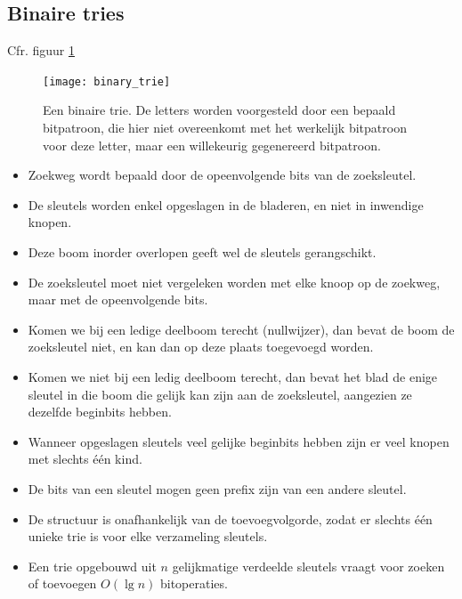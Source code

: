 \documentclass{report}
\begin{document}
\subsection{Binaire tries}
Cfr. figuur \ref{fig:binary_trie}
\begin{figure}[ht]
	\centering
	\texttt{[image: binary\_trie]}
	\caption{Een binaire trie. De letters worden voorgesteld door een bepaald bitpatroon, die hier niet overeenkomt met het werkelijk bitpatroon voor deze letter, maar een willekeurig gegenereerd bitpatroon.}
	\label{fig:binary_trie}
\end{figure}
\begin{itemize}
	\item[\info] Zoekweg wordt bepaald door de opeenvolgende bits van de zoeksleutel.
	\item[\info] De sleutels worden enkel opgeslagen in de bladeren, en niet in inwendige knopen.
	\item[\good] Deze boom inorder overlopen geeft wel de sleutels gerangschikt.
	\item[\good] De zoeksleutel moet niet vergeleken worden met elke knoop op de zoekweg, maar met de opeenvolgende bits.  
	\item[\info] Komen we bij een ledige deelboom terecht (nullwijzer), dan bevat de boom de zoeksleutel niet, en kan dan op deze plaats toegevoegd worden.
	\item[\info] Komen we niet bij een ledig deelboom terecht, dan bevat het blad de enige sleutel in die boom die gelijk kan zijn aan de zoeksleutel, aangezien ze dezelfde beginbits hebben.
	\item[\alert] Wanneer opgeslagen sleutels veel gelijke beginbits hebben zijn er veel knopen met slechts één kind.
	\item[\alert] De bits van een sleutel mogen geen prefix zijn van een andere sleutel. 
	\item[\good] De structuur is onafhankelijk van de toevoegvolgorde, zodat er slechts één unieke trie is voor elke verzameling sleutels.
	\item[\info] Een trie opgebouwd uit $n$ gelijkmatige verdeelde sleutels vraagt voor zoeken of toevoegen $O(\lg n)$ bitoperaties. 
\end{itemize}
\end{document}
